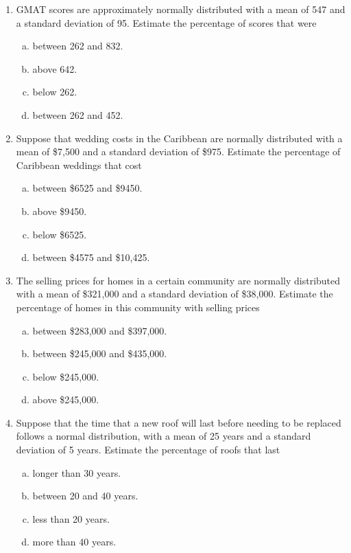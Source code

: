 \begin{enumerate}
\item GMAT scores are approximately normally distributed with a mean of 547 and a standard deviation of 95.  Estimate the percentage of scores that were
\begin{enumerate}[(a)]
\item between 262 and 832. 
\item above 642. 
\item below 262. 
\item between 262 and 452. 
\end{enumerate}

\item Suppose that wedding costs in the Caribbean are normally distributed with a mean of \$7,500 and a standard deviation of \$975.  Estimate the percentage of Caribbean weddings that cost
\begin{enumerate}[(a)]
\item between \$6525 and \$9450. 
\item above \$9450. 
\item below \$6525. 
\item between \$4575 and \$10,425. 
\end{enumerate}

\item The selling prices for homes in a certain community are normally distributed with a mean of \$321,000 and a standard deviation of \$38,000.  Estimate the percentage of homes in this community with selling prices
\begin{enumerate}[(a)]
\item between \$283,000 and \$397,000. 
\item between \$245,000 and \$435,000. 
\item below \$245,000. 
\item above \$245,000. 
\end{enumerate}

\item Suppose that the time that a new roof will last before needing to be replaced follows a normal distribution, with a mean of 25 years and a standard deviation of 5 years.  Estimate the percentage of roofs that last
\begin{enumerate}[(a)]
\item longer than 30 years. 
\item between 20 and 40 years. 
\item less than 20 years. 
\item more than 40 years. 
\end{enumerate}


\end{enumerate}
